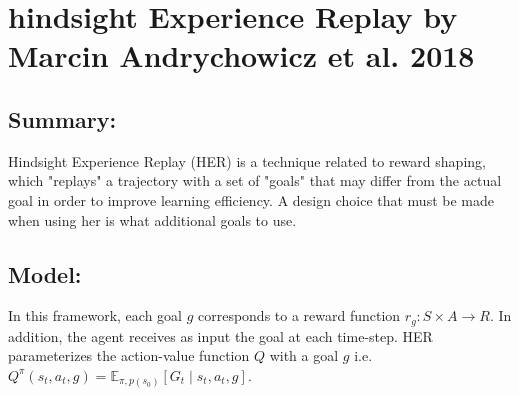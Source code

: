 \section{hindsight Experience Replay by Marcin Andrychowicz et al. 2018}

\subsection{Summary:}

Hindsight Experience Replay (HER) is a technique related to reward shaping, which
"replays" a trajectory with a set of "goals" that may differ from the actual goal 
in order to improve learning efficiency. A design choice that must be made when using her
is what additional goals to use. 

\subsection{Model:}
In this framework, each goal $g$ corresponds to a reward function $r_g : S \times A \rightarrow R$.
In addition, the agent receives as input the goal at each time-step.
HER parameterizes the action-value function $Q$ with a goal $g$
i.e. $Q^{\pi}(s_t, a_t, g) = \mathbb{E}_{\pi, p(s_0)}[G_t \mid s_t, a_t, g]$.

